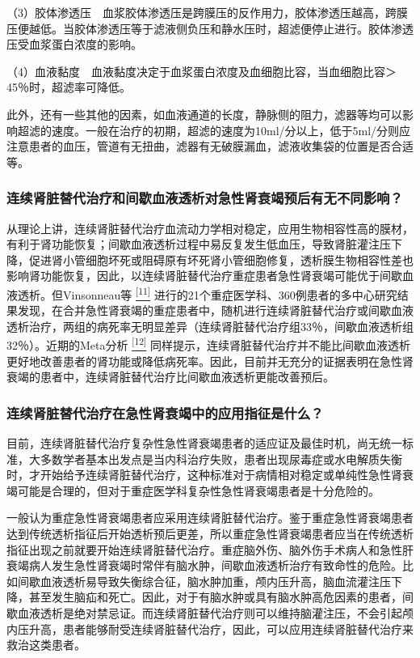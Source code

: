 （3）胶体渗透压　血浆胶体渗透压是跨膜压的反作用力，胶体渗透压越高，跨膜压便越低。当胶体渗透压等于滤液侧负压和静水压时，超滤便停止进行。胶体渗透压受血浆蛋白浓度的影响。

（4）血液黏度　血液黏度决定于血浆蛋白浓度及血细胞比容，当血细胞比容＞45％时，超滤率可降低。

此外，还有一些其他的因素，如血液通道的长度，静脉侧的阻力，滤器等均可以影响超滤的速度。一般在治疗的初期，超滤的速度为10ml/分以上，低于5ml/分则应注意患者的血压，管道有无扭曲，滤器有无破膜漏血，滤液收集袋的位置是否合适等。

\subsubsection{连续肾脏替代治疗和间歇血液透析对急性肾衰竭预后有无不同影响？}

从理论上讲，连续肾脏替代治疗血流动力学相对稳定，应用生物相容性高的膜材，有利于肾功能恢复；间歇血液透析过程中易反复发生低血压，导致肾脏灌注压下降，促进肾小管细胞坏死或阻碍原有坏死肾小管细胞修复，透析膜生物相容性差也影响肾功能恢复，因此，以连续肾脏替代治疗重症患者急性肾衰竭可能优于间歇血液透析。但Vinsonneau等
\protect\hyperlink{text00018.htmlux5cux23ch11-17}{\textsuperscript{{[}11{]}}}
进行的21个重症医学科、360例患者的多中心研究结果发现，在合并急性肾衰竭的重症患者中，随机进行连续肾脏替代治疗或间歇血液透析治疗，两组的病死率无明显差异（连续肾脏替代治疗组33％，间歇血液透析组32％）。近期的Meta分析
\protect\hyperlink{text00018.htmlux5cux23ch12-17}{\textsuperscript{{[}12{]}}}
同样提示，连续肾脏替代治疗并不能比间歇血液透析更好地改善患者的肾功能或降低病死率。因此，目前并无充分的证据表明在急性肾衰竭的患者中，连续肾脏替代治疗比间歇血液透析更能改善预后。

\subsubsection{连续肾脏替代治疗在急性肾衰竭中的应用指征是什么？}

目前，连续肾脏替代治疗复杂性急性肾衰竭患者的适应证及最佳时机，尚无统一标准，大多数学者基本出发点是当内科治疗失败，患者出现尿毒症或水电解质失衡时，才开始给予连续肾脏替代治疗，这种标准对于病情相对稳定或单纯性急性肾衰竭可能是合理的，但对于重症医学科复杂性急性肾衰竭患者是十分危险的。

一般认为重症急性肾衰竭患者应采用连续肾脏替代治疗。鉴于重症急性肾衰竭患者达到传统透析指征后开始透析预后更差，所以重症急性肾衰竭患者应当在传统透析指征出现之前就要开始连续肾脏替代治疗。重症脑外伤、脑外伤手术病人和急性肝衰竭病人发生急性肾衰竭时常伴有脑水肿，间歇血液透析治疗有致命性的危险。比如间歇血液透析易导致失衡综合征，脑水肿加重，颅内压升高，脑血流灌注压下降，甚至发生脑疝和死亡。因此，对于有脑水肿或具有脑水肿高危因素的患者，间歇血液透析是绝对禁忌证。而连续肾脏替代治疗则可以维持脑灌注压，不会引起颅内压升高，患者能够耐受连续肾脏替代治疗，因此，可以应用连续肾脏替代治疗来救治这类患者。

